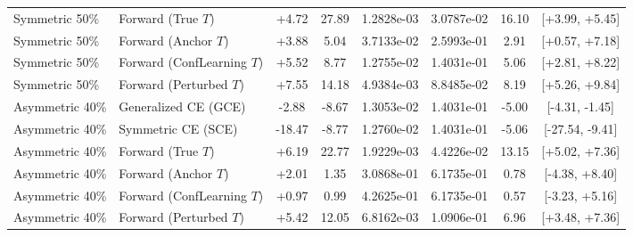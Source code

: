 \begin{table}[t]
\begin{tabular}{llcccccc}
Symmetric 50\% & Forward (True $T$) & +4.72 & 27.89 & 1.2828e-03 & 3.0787e-02 & 16.10 & [+3.99, +5.45] \\
Symmetric 50\% & Forward (Anchor $T$) & +3.88 & 5.04 & 3.7133e-02 & 2.5993e-01 & 2.91 & [+0.57, +7.18] \\
Symmetric 50\% & Forward (ConfLearning $T$) & +5.52 & 8.77 & 1.2755e-02 & 1.4031e-01 & 5.06 & [+2.81, +8.22] \\
Symmetric 50\% & Forward (Perturbed $T$) & +7.55 & 14.18 & 4.9384e-03 & 8.8485e-02 & 8.19 & [+5.26, +9.84] \\
Asymmetric 40\% & Generalized CE (GCE) & -2.88 & -8.67 & 1.3053e-02 & 1.4031e-01 & -5.00 & [-4.31, -1.45] \\
Asymmetric 40\% & Symmetric CE (SCE) & -18.47 & -8.77 & 1.2760e-02 & 1.4031e-01 & -5.06 & [-27.54, -9.41] \\
Asymmetric 40\% & Forward (True $T$) & +6.19 & 22.77 & 1.9229e-03 & 4.4226e-02 & 13.15 & [+5.02, +7.36] \\
Asymmetric 40\% & Forward (Anchor $T$) & +2.01 & 1.35 & 3.0868e-01 & 6.1735e-01 & 0.78 & [-4.38, +8.40] \\
Asymmetric 40\% & Forward (ConfLearning $T$) & +0.97 & 0.99 & 4.2625e-01 & 6.1735e-01 & 0.57 & [-3.23, +5.16] \\
Asymmetric 40\% & Forward (Perturbed $T$) & +5.42 & 12.05 & 6.8162e-03 & 1.0906e-01 & 6.96 & [+3.48, +7.36] \\
\hline
\end{tabular}
\end{table}
